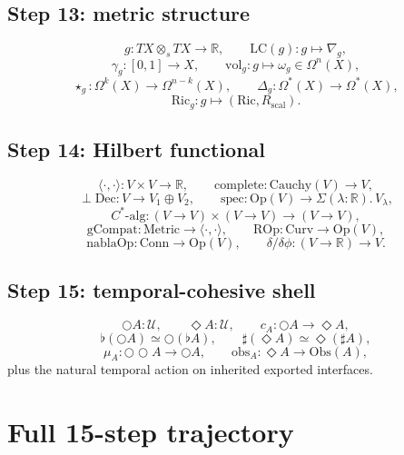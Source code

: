 \documentclass[11pt]{article}
\theoremstyle{plain}
\theoremstyle{definition}
\theoremstyle{remark}
\newcommand{\R}{\mathbb{R}}
\newcommand{\U}{\mathcal{U}}
\newcommand{\lc}{\mathrm{LC}}
\newcommand{\Ric}{\mathrm{Ric}}
\newcommand{\vol}{\mathrm{vol}}
\begin{document}
\subsection{Step 13: metric structure}

\[
  g:TX\otimes_s TX\to\R,
  \qquad
  \lc(g):g\mapsto\nabla_g,
\]
\[
  \gamma_g:[0,1]\to X,
  \qquad
  \vol_g:g\mapsto\omega_g\in\Omega^n(X),
\]
\[
  \star_g:\Omega^k(X)\to\Omega^{n-k}(X),
  \qquad
  \Delta_g:\Omega^*(X)\to\Omega^*(X),
\]
\[
  \Ric_g:g\mapsto(\Ric,R_{\mathrm{scal}}).
\]

\subsection{Step 14: Hilbert functional}

\[
  \langle\cdot,\cdot\rangle:V\times V\to\R,
  \qquad
  \mathrm{complete}:\mathrm{Cauchy}(V)\to V,
\]
\[
  \perp\mathrm{Dec}:V\to V_1\oplus V_2,
  \qquad
  \mathrm{spec}:\mathrm{Op}(V)\to\Sigma(\lambda:\R).\,V_\lambda,
\]
\[
  C^*\text{-alg}:(V\to V)\times(V\to V)\to(V\to V),
\]
\[
  \mathrm{gCompat}:\mathrm{Metric}\to\langle\cdot,\cdot\rangle,
  \qquad
  \mathrm{ROp}:\mathrm{Curv}\to\mathrm{Op}(V),
\]
\[
  \mathrm{nablaOp}:\mathrm{Conn}\to\mathrm{Op}(V),
  \qquad
  \delta/\delta\phi:(V\to\R)\to V.
\]

\subsection{Step 15: temporal-cohesive shell}

\[
  \bigcirc A:\U,
  \qquad
  \Diamond A:\U,
  \qquad
  c_A:\bigcirc A\to\Diamond A,
\]
\[
  \flat(\bigcirc A)\simeq\bigcirc(\flat A),
  \qquad
  \sharp(\Diamond A)\simeq\Diamond(\sharp A),
\]
\[
  \mu_A:\bigcirc\bigcirc A\to\bigcirc A,
  \qquad
  \mathrm{obs}_A:\Diamond A\to \mathrm{Obs}(A),
\]
plus the natural temporal action on inherited exported interfaces.

\section{Full 15-step trajectory}
\end{document}
